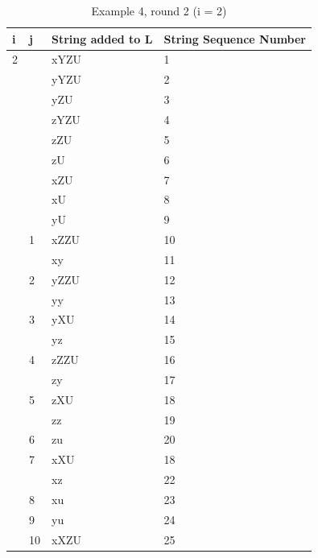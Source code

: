 \documentclass{sig-alternate-05-2015}
\begin{document}
\begin{table}[h]
\centering
\caption{Example 4, round 2 (i = 2)}
\label{table:Example4Roud2}
\begin{tabular}{|l|l|l|l|}
\hline
i & j  & String added to L & String Sequence Number \\
\hline
2 &    & xYZU              & 1                      \\
  &    & yYZU              & 2                      \\
  &    & yZU               & 3                      \\
  &    & zYZU              & 4                      \\
  &    & zZU               & 5                      \\
  &    & zU                & 6                      \\
  &    & xZU               & 7                      \\
  &    & xU                & 8                      \\
  &    & yU                & 9                      \\
  & 1  & xZZU              & 10                     \\
  &    & xy                & 11                     \\
  & 2  & yZZU              & 12                     \\
  &    & yy                & 13                     \\
  & 3  & yXU               & 14                     \\
  &    & yz                & 15                     \\
  & 4  & zZZU              & 16                     \\
  &    & zy                & 17                     \\
  & 5  & zXU               & 18                     \\
  &    & zz                & 19                     \\
  & 6  & zu                & 20                     \\
  & 7  & xXU               & 18                     \\
  &    & xz                & 22                     \\
  & 8  & xu                & 23                     \\
  & 9  & yu                & 24                     \\
  & 10 & xXZU              & 25                     \\

\end{tabular}
\end{table}
\end{document}
